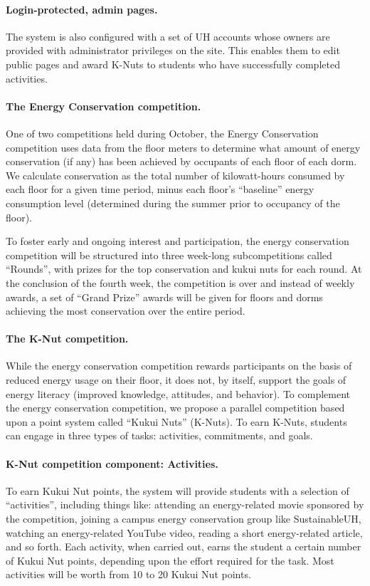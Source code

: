 \documentclass[11pt]{article}
\begin{document}
\paragraph{Login-protected, admin pages.}  The system is also configured
with a set of UH accounts whose owners are provided with administrator
privileges on the site.  This enables them to edit public pages and award
K-Nuts to students who have successfully completed activities.

\paragraph{The Energy Conservation competition.}  One of two competitions
held during October, the Energy Conservation competition uses data from the
floor meters to determine what amount of energy conservation (if any) has
been achieved by occupants of each floor of each dorm.  We calculate
conservation as the total number of kilowatt-hours consumed by each floor
for a given time period, minus each floor's ``baseline'' energy consumption
level (determined during the summer prior to occupancy of the floor).

To foster early and ongoing interest and participation, the energy
conservation competition will be structured into three week-long
subcompetitions called ``Rounds'', with prizes for the top conservation and kukui nuts
for each round.  At the conclusion of the fourth week, the competition is over and
instead of weekly awards, a set of ``Grand Prize'' awards will be given for
floors and dorms achieving the most conservation over the entire period.

\paragraph{The K-Nut competition.}  While the energy conservation
competition rewards participants on the basis of reduced energy usage on
their floor, it does not, by itself, support the goals of energy literacy
(improved knowledge, attitudes, and behavior).  To complement the energy
conservation competition, we propose a parallel competition based upon a
point system called ``Kukui Nuts'' (K-Nuts).   To earn K-Nuts, students can 
engage in three types of tasks: activities, commitments, and goals.

\paragraph{K-Nut competition component: Activities.}  To earn Kukui Nut
points, the system will provide students with a selection of
``activities'', including things like: attending an energy-related movie
sponsored by the competition, joining a campus energy conservation group
like SustainableUH, watching an energy-related YouTube video, reading a
short energy-related article, and so forth.  Each activity, when carried
out, earns the student a certain number of Kukui Nut points, depending upon
the effort required for the task.  Most activities will be worth from 10 to
20 Kukui Nut points.
\end{document}
